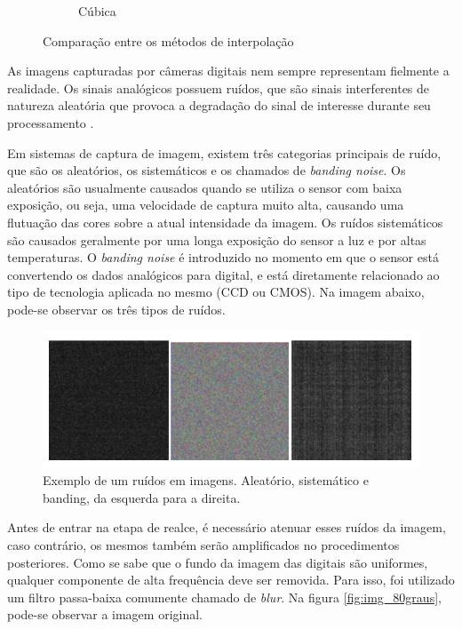 \begin{figure}
\begin{subfigure}[b]{0.475\textwidth}
            \caption[]%
            {{\small Cúbica}}    
            \label{fig:intd}
        \end{subfigure}
        \caption[ The average and standard deviation of critical parameters ]
        {\small Comparação entre os métodos de interpolação} 
        \label{fig:scale}
    \end{figure}
		
		As imagens capturadas por câmeras digitais nem sempre representam fielmente a realidade. Os sinais analógicos possuem ruídos, que são sinais interferentes de natureza aleatória que provoca a degradação do sinal de interesse durante seu processamento \cite{fabris}.
		
		Em sistemas de captura de imagem, existem três categorias principais de ruído, que são os aleatórios, os sistemáticos e os chamados de \textit{banding noise}. Os aleatórios são usualmente causados quando se utiliza o sensor com baixa exposição, ou seja, uma velocidade de captura muito alta, causando uma flutuação das cores sobre a atual intensidade da imagem. Os ruídos sistemáticos são causados geralmente por uma longa exposição do sensor a luz e por altas temperaturas. O \textit{banding noise} é introduzido no momento em que o sensor está convertendo os dados analógicos para digital, e está diretamente relacionado ao tipo de tecnologia aplicada no mesmo (CCD ou CMOS). Na imagem abaixo, pode-se observar os três tipos de ruídos.
	
		\begin{figure}[!ht]
		   \centering
		   \includegraphics[width=14cm]{Figures/noise.png}
		   \caption{Exemplo de um ruídos em imagens. Aleatório, sistemático e banding, da esquerda para a direita.}
		   \label{fig:noise}
		\end{figure}


		
		Antes de entrar na etapa de realce, é necessário atenuar esses ruídos da imagem, caso contrário, os mesmos também serão amplificados no procedimentos posteriores. Como se sabe que o fundo da imagem das digitais são uniformes, qualquer componente de alta frequência deve ser removida. Para isso, foi utilizado um filtro passa-baixa comumente chamado de \textit{blur}. Na figura \ref{fig:img_80graus}, pode-se observar a imagem original.
			
